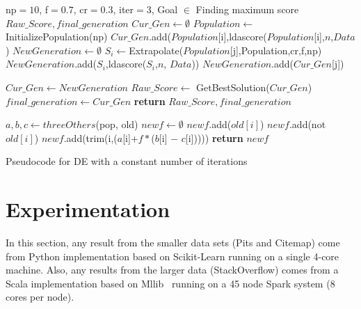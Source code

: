 \documentclass[twocolumn,5p,sort&compress]{elsarticle}
\renewcommand{\algorithmicrequire}{\textbf{Input:}}
\renewcommand{\algorithmicensure}{\textbf{Output:}}
\theoremstyle{break}
\begin{document}
\renewcommand{\algorithmicrequire}{\textbf{Input:}}
\renewcommand{\algorithmicensure}{\textbf{Output:}}
\begin{algorithm}
  
    \begin{algorithmic}[1]
    \Require np$=10$, f$=0.7$, cr$=0.3$, iter$=3$, Goal $\in$ Finding maximum score
    \Ensure $Raw\_Score, final\_generation$
        \State  $Cur\_Gen \leftarrow \emptyset$
        \State $Population \leftarrow $InitializePopulation(np)
            \State $Cur\_Gen$.add($Population$[i],ldascore($Population$[i],$n$,$Data$)
        \EndFor
            \State $NewGeneration \leftarrow \emptyset$
                \State $S_i \leftarrow $Extrapolate($Population$[j],Population,cr,f,np)
                    \State $NewGeneration$.add($S_i$,ldascore($S_i$,$n$, $Data$))
                \Else
                    \State $NewGeneration$.add($Cur\_Gen$[j])
                \EndIf
            
            \EndFor
            \State  $Cur\_Gen \leftarrow NewGeneration$
        \EndFor
        \State $Raw\_Score \leftarrow$ GetBestSolution($Cur\_Gen$)
        \State  $final\_generation \leftarrow Cur\_Gen$
        \State \textbf{return} $Raw\_Score, final\_generation$
    \EndFunction

        \State $a,b,c \leftarrow threeOthers$(pop, old)
        \State $newf \leftarrow \emptyset$
                \State $newf$.add($old[i]$)
            \Else
                    \State $newf$.add(not $old[i]$)
                \Else 
                    \State $newf$.add(trim(i,($a$[i]+$f\ast$($b$[i] $-$ $c$[i]))))
                \EndIf
            \EndIf
        \EndFor
        \State \textbf{return} $newf$ 
    \EndFunction
    \caption{Pseudocode for DE with a constant number of iterations}
    \end{algorithmic}
\end{algorithm}
\section{Experimentation}\label{sect:results}

In this section,
 any result from the smaller data sets (Pits and Citemap) come
from Python implementation based on Scikit-Learn running on a single 4-core machine.
Also,
  any results from the larger data (StackOverflow) comes from a Scala implementation
  based on Mllib~\cite{meng2016mllib} running on a 45 node Spark system (8 cores per node).
  
\end{document}
